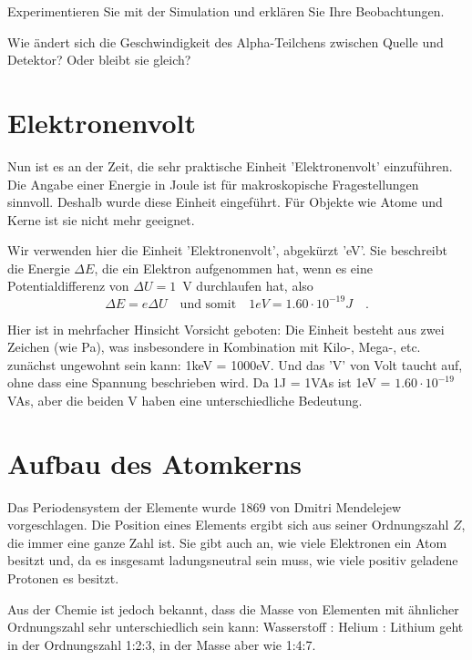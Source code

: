 \begin{questions}  
    \item Experimentieren Sie mit der Simulation und erklären Sie Ihre Beobachtungen.
    \item Wie ändert sich die Geschwindigkeit des Alpha-Teilchens zwischen Quelle und Detektor? Oder bleibt sie gleich?
\end{questions}

    

\section{Elektronenvolt}

Nun ist es an der Zeit, die sehr praktische Einheit 'Elektronenvolt' einzuführen. Die Angabe einer Energie in Joule ist für makroskopische Fragestellungen sinnvoll. Deshalb wurde diese Einheit eingeführt. Für Objekte wie Atome und Kerne ist sie nicht mehr geeignet. 

Wir verwenden hier die Einheit 'Elektronenvolt', abgekürzt 'eV'. Sie beschreibt die Energie $\Delta E$, die ein Elektron aufgenommen hat, wenn es eine Potentialdifferenz von $\Delta U =1$~V durchlaufen hat, also 
\begin{equation}
    \Delta E = e \Delta U \quad \text{und somit} \quad \si{1}{eV} = 1.60  \cdot 10^{-19} J \quad .
\end{equation} 

Hier ist in mehrfacher Hinsicht Vorsicht geboten: Die Einheit besteht aus zwei Zeichen (wie Pa), was insbesondere in Kombination mit Kilo-, Mega-, etc. zunächst ungewohnt sein kann: \si{1}{keV} = \si{1000}{eV}. Und das 'V' von Volt taucht auf, ohne dass eine Spannung beschrieben wird. Da \si{1}{J} = \si{1}{VAs} ist \si{1}{eV} =  $1.60 \cdot 10^{-19}$VAs, aber die beiden V haben eine unterschiedliche Bedeutung.


\section{Aufbau des Atomkerns}

Das Periodensystem der Elemente wurde 1869 von Dmitri Mendelejew vorgeschlagen. Die Position eines Elements ergibt sich aus seiner Ordnungszahl $Z$, die immer eine ganze Zahl ist. Sie gibt auch an, wie viele Elektronen ein Atom besitzt und, da es insgesamt ladungsneutral sein muss, wie viele positiv geladene Protonen es besitzt. 

Aus der Chemie ist jedoch bekannt, dass die Masse von Elementen mit ähnlicher Ordnungszahl sehr unterschiedlich sein kann: Wasserstoff : Helium : Lithium geht in der Ordnungszahl 1:2:3, in der Masse aber wie 1:4:7.

